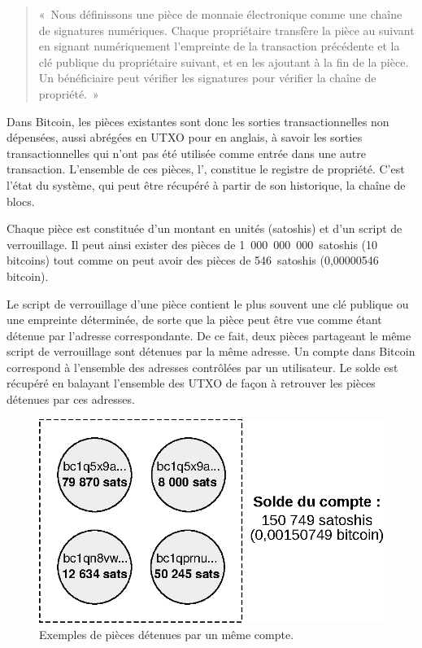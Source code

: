 \begin{quote}
«~Nous définissons une pièce de monnaie électronique comme une chaîne de signatures numériques. Chaque propriétaire transfère la pièce au suivant en signant numériquement l'empreinte de la transaction précédente et la clé publique du propriétaire suivant, et en les ajoutant à la fin de la pièce. Un bénéficiaire peut vérifier les signatures pour vérifier la chaîne de propriété.~»
\end{quote}

Dans Bitcoin, les pièces existantes sont donc les sorties transactionnelles non dépensées, aussi abrégées en UTXO pour  en anglais, à savoir les sorties transactionnelles qui n'ont pas été utilisée comme entrée dans une autre transaction. L'ensemble de ces pièces, l', constitue le registre de propriété. C'est l'état du système, qui peut être récupéré à partir de son historique, la chaîne de blocs.

Chaque pièce est constituée d'un montant en unités (satoshis) et d'un script de verrouillage. Il peut ainsi exister des pièces de 1~000~000~000~satoshis (10 bitcoins) tout comme on peut avoir des pièces de 546~satoshis (0,00000546 bitcoin).

Le script de verrouillage d'une pièce contient le plus souvent une clé publique ou une empreinte déterminée, de sorte que la pièce peut être vue comme étant détenue par l'adresse correspondante. De ce fait, deux pièces partageant le même script de verrouillage sont détenues par la même adresse. Un compte dans Bitcoin correspond à l'ensemble des adresses contrôlées par un utilisateur. Le solde est récupéré en balayant l'ensemble des UTXO de façon à retrouver les pièces détenues par ces adresses.

\begin{figure}[ht]
  \centering
  \includegraphics[scale=0.75]{img/coins-utxos-account.eps}
  \caption{Exemples de pièces détenues par un même compte.}
  \label{fig:coins-utxos}
\end{figure}

